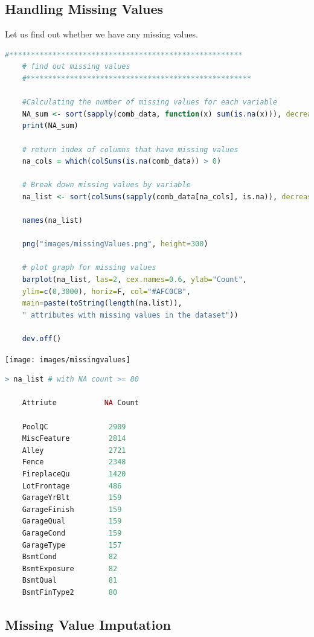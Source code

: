 \documentclass[sigconf]{acmart}
\begin{document}
	\subsection{Handling Missing Values}
		
	Let us find out whether we have any missing values.
	
	\begin{lstlisting}[language=R]
	#******************************************************
	# find out missing values
	#****************************************************
	
	#Calculating the number of missing values for each variable
	NA_sum <- sort(sapply(comb_data, function(x) sum(is.na(x))), decreasing = TRUE)
	print(NA_sum) 
	
	# return index of columns that have missing values 
	na_cols = which(colSums(is.na(comb_data)) > 0)
	
	# Break down missing values by variable
	na_list <- sort(colSums(sapply(comb_data[na_cols], is.na)), decreasing = TRUE)
	
	names(na_list)
	
	png("images/missingValues.png", height=300)
	
	# plot graph for missing values
	barplot(na_list, las=2, cex.names=0.6, ylab="Count",
	ylim=c(0,3000), horiz=F, col="#AFC0CB",
	main=paste(toString(length(na.list)), 
	" attributes with missing values in the dataset"))
	
	dev.off()
	\end{lstlisting}
	
	\begin{center}
		\texttt{[image: images/missingvalues]}
	\end{center}
	
	\begin{lstlisting}[language=R]
	> na_list # with NA count >= 80
	
	Attriute           NA Count
	
	PoolQC              2909
	MiscFeature         2814
	Alley               2721
	Fence               2348
	FireplaceQu         1420
	LotFrontage         486
	GarageYrBlt         159
	GarageFinish        159
	GarageQual          159
	GarageCond          159
	GarageType          157
	BsmtCond            82
	BsmtExposure        82
	BsmtQual            81
	BsmtFinType2        80
	\end{lstlisting}
	
	\subsection{Missing Value Imputation}
\end{document}
